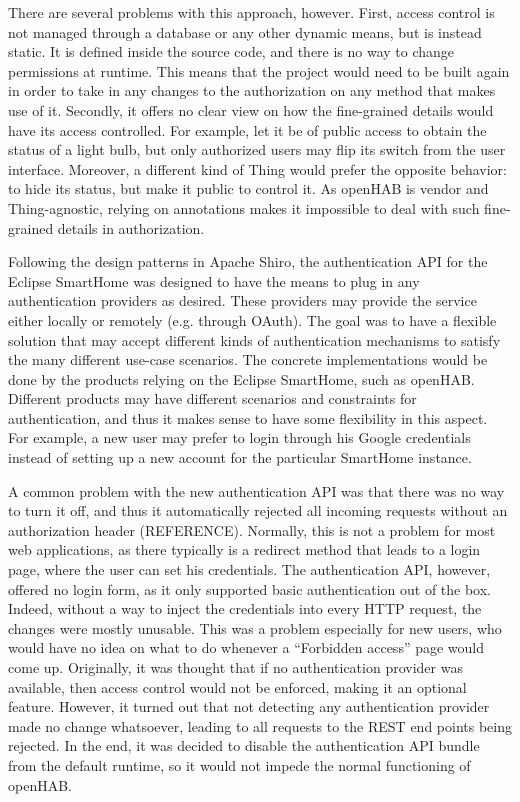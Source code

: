 \documentclass[12pt]{article}
\begin{document}
There are several problems with this approach, however. First, access control is not managed through a database or any other dynamic means, but is instead static. It is defined inside the source code, and there is no way to change permissions at runtime. This means that the project would need to be built again in order to take in any changes to the authorization on any method that makes use of it. Secondly, it offers no clear view on how the fine-grained details would have its access controlled. For example, let it be of public access to obtain the status of a light bulb, but only authorized users may flip its switch from the user interface. Moreover, a different kind of Thing would prefer the opposite behavior: to hide its status, but make it public to control it. As openHAB is vendor and Thing-agnostic, relying on annotations makes it impossible to deal with such fine-grained details in authorization.

Following the design patterns in Apache Shiro, the authentication API for the Eclipse SmartHome was designed to have the means to plug in any authentication providers as desired. These providers may provide the service either locally or remotely (e.g. through OAuth). The goal was to have a flexible solution that may accept different kinds of authentication mechanisms to satisfy the many different use-case scenarios. The concrete implementations would be done by the products relying on the Eclipse SmartHome, such as openHAB. Different products may have different scenarios and constraints for authentication, and thus it makes sense to have some flexibility in this aspect. For example, a new user may prefer to login through his Google credentials instead of setting up a new account for the particular SmartHome instance. 

A common problem with the new authentication API was that there was no way to turn it off, and thus it automatically rejected all incoming requests without an authorization header (REFERENCE). Normally, this is not a problem for most web applications, as there typically is a redirect method that leads to a login page, where the user can set his credentials. The authentication API, however, offered no login form, as it only supported basic authentication out of the box. Indeed, without a way to inject the credentials into every HTTP request, the changes were mostly unusable. This was a problem especially for new users, who would have no idea on what to do whenever a ``Forbidden access'' page would come up. Originally, it was thought that if no authentication provider was available, then access control would not be enforced, making it an optional feature. However, it turned out that not detecting any authentication provider made no change whatsoever, leading to all requests to the REST end points being rejected. In the end, it was decided to disable the authentication API bundle from the default runtime, so it would not impede the normal functioning of openHAB.
\end{document}
